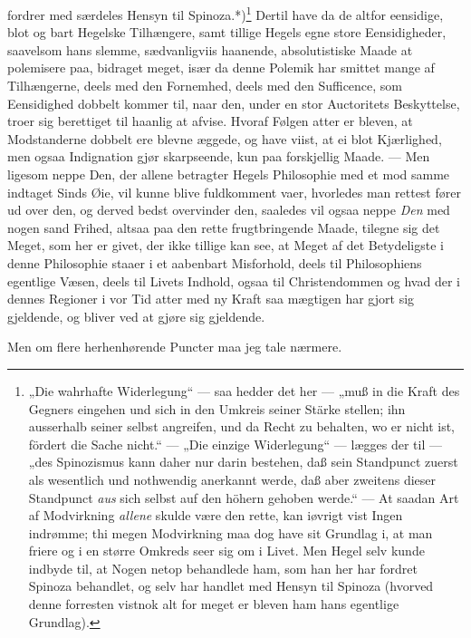 \documentclass[12pt,a4paper]{book}
\newcommand{\apage}[1]{\marginnote{\footnotesize\textit{[#1]}}}
\begin{document}
fordrer med særdeles Hensyn til Spinoza.*)\footnote{„Die wahrhafte
Widerlegung“ --- saa hedder det her --- „muß in die Kraft des Gegners
eingehen und sich in den Umkreis seiner Stärke stellen; ihn ausserhalb
seiner selbst angreifen, und da Recht zu behalten, wo er nicht ist, fördert
die Sache nicht.“ --- „Die einzige Widerlegung“ --- lægges der til --- „des
Spinozismus kann daher nur darin bestehen, daß sein Standpunct zuerst als
wesentlich und nothwendig anerkannt werde, daß aber zweitens dieser
Standpunct \emph{aus} sich selbst auf den höhern gehoben werde.“ --- At saadan Art
af Modvirkning \emph{allene} skulde være den rette, kan iøvrigt vist Ingen
indrømme; thi megen Modvirkning maa dog have sit Grundlag i, at man friere
og i en større Omkreds seer sig om i Livet. Men Hegel selv kunde indbyde
til, at Nogen netop behandlede ham, som han her har fordret Spinoza
behandlet, og selv har handlet med Hensyn til Spinoza (hvorved denne
forresten vistnok alt for meget er bleven ham hans egentlige Grundlag).}
Dertil have da de altfor eensidige, blot og bart Hegelske Tilhængere, samt
tillige Hegels egne store Eensidigheder, saavelsom hans slemme,
sædvanligviis haanende, absolutistiske Maade at polemisere paa, bidraget
meget, især da denne Polemik har smittet mange af Tilhængerne, deels med den
Fornemhed, deels med den Sufficence, som Eensidighed dobbelt kommer til,
naar den, under en stor Auctoritets Beskyttelse, troer sig berettiget til
haanlig at afvise. Hvoraf Følgen atter er bleven, at Modstanderne dobbelt
ere blevne æggede, og have viist, at ei blot Kjærlighed, men ogsaa
Indignation gjør skarpseende, kun paa forskjellig Maade. --- Men ligesom
neppe Den, der allene betragter Hegels Philosophie med et mod samme indtaget
Sinds Øie, vil kunne blive fuldkomment vaer, hvorledes man rettest fører ud
over den, og derved bedst overvinder den, saaledes vil ogsaa neppe \emph{Den} med
nogen sand Frihed, altsaa paa den rette frugtbringende Maade, tilegne sig
det Meget, som her er givet, der ikke tillige kan see, at Meget af det
Betydeligste i denne Philosophie staaer i et aabenbart Misforhold, deels til
Philosophiens egentlige Væsen, deels til Livets Indhold, ogsaa
\apage{33} til Christendommen og hvad der i dennes Regioner i vor Tid atter
med ny Kraft saa mægtigen har gjort sig gjeldende, og bliver ved
at gjøre sig gjeldende.

%
Men om flere herhenhørende Puncter maa jeg tale nærmere.
\end{document}
